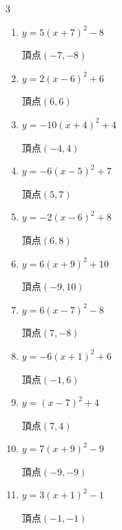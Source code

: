 \begin{multicols}{3}
\begin{enumerate}
        $\displaystyle 頂点\left( 9 , -8 \right)$

  \item $\displaystyle y=5\left( x+7\right)^{2}-8$

        $\displaystyle 頂点\left( -7 , -8 \right)$

  \item $\displaystyle y=2\left( x-6\right)^{2}+6$

        $\displaystyle 頂点\left( 6 , 6 \right)$

  \item $\displaystyle y=-10\left( x+4\right)^{2}+4$

        $\displaystyle 頂点\left( -4 , 4 \right)$

  \item $\displaystyle y=-6\left( x-5\right)^{2}+7$

        $\displaystyle 頂点\left( 5 , 7 \right)$

  \item $\displaystyle y=-2\left( x-6\right)^{2}+8$

        $\displaystyle 頂点\left( 6 , 8 \right)$

  \item $\displaystyle y=6\left( x+9\right)^{2}+10$

        $\displaystyle 頂点\left( -9 , 10 \right)$

  \item $\displaystyle y=6\left( x-7\right)^{2}-8$

        $\displaystyle 頂点\left( 7 , -8 \right)$

  \item $\displaystyle y=-6\left( x+1\right)^{2}+6$

        $\displaystyle 頂点\left( -1 , 6 \right)$

\columnbreak %

\resetques

  \item $\displaystyle y=\left( x-7\right)^{2}+4$

        $\displaystyle 頂点\left( 7 , 4 \right)$

  \item $\displaystyle y=7\left( x+9\right)^{2}-9$

        $\displaystyle 頂点\left( -9 , -9 \right)$

  \item $\displaystyle y=3\left( x+1\right)^{2}-1$

        $\displaystyle 頂点\left( -1 , -1 \right)$


\end{enumerate}
\end{multicols}
